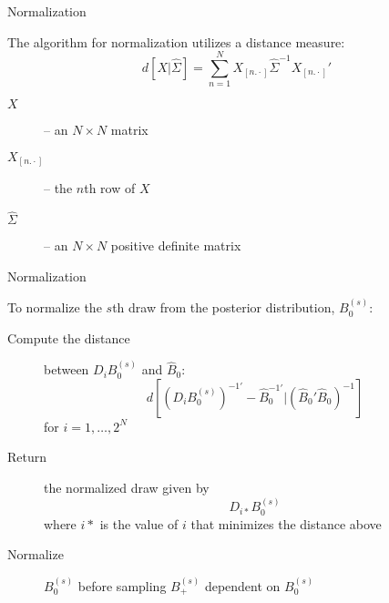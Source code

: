 \documentclass[notes,blackandwhite,mathsans,usenames,dvipsnames]{beamer}
\begin{document}
\begin{frame}{Normalization}

{\color{mcxs2}The algorithm for normalization utilizes a {\color{purple}distance measure}:}
$$
d\left[ X | \widehat\Sigma \right] = \sum_{n=1}^{N}X_{[n.\cdot]} \widehat\Sigma^{-1} X_{[n.\cdot]}'
$$
\begin{description}
\item[$X$] {\color{mcxs2}-- an} $N\times N$ {\color{mcxs2}matrix}
\item[$X_{[n.\cdot]}$] {\color{mcxs2}-- the} $n${\color{mcxs2}th row of} $X$
\item[$\widehat\Sigma$] {\color{mcxs2}-- an} $N\times N$ {\color{mcxs2}positive definite matrix}
\end{description}

\end{frame}




\begin{frame}{Normalization}

{\color{mcxs2}To normalize the} $s${\color{mcxs2}th draw from the posterior distribution,} $B_0^{(s)}$:
\begin{description}
\item[Compute the distance]  {\color{mcxs2}between} $D_iB_0^{(s)}$ {\color{mcxs2}and} $\widehat{B}_0$:
$$
d\left[ \left( D_i B_0^{(s)} \right)^{-1\prime} - \widehat{B}_0^{-1\prime} \Big| \left( \widehat{B}_0' \widehat{B}_0 \right)^{-1} \right]
$$
{\color{mcxs2}for } $i=1,\dots,2^N$

\bigskip\item[Return] {\color{mcxs2}the normalized draw given by} 
$$D_{i*}B_0^{(s)}$$ 
{\color{mcxs2}where} $i*$ {\color{mcxs2}is the value of} $i$ {\color{mcxs2}that {\color{purple}minimizes the distance} above}

\bigskip\item[Normalize]  $B_0^{(s)}$ {\color{mcxs2}before sampling} $B_+^{(s)}$ {\color{mcxs2}dependent on} $B_0^{(s)}$
\end{description}

\end{frame}
\end{document}

